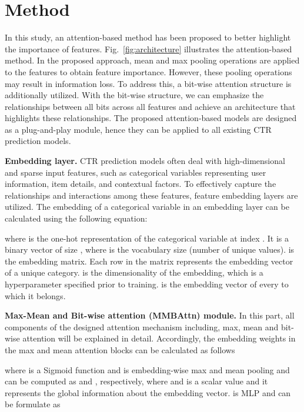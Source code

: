 \documentclass{article}
\begin{document}
\section{Method}
In this study, an attention-based method has been proposed to better highlight the importance of features. Fig.~\ref{fig:architecture} illustrates the attention-based method. In the proposed approach, mean and max pooling operations are applied to the features to obtain feature importance. However, these pooling operations may result in information loss. To address this, a bit-wise attention structure is additionally utilized. With the bit-wise structure, we can emphasize the relationships between all bits across all features and achieve an architecture that highlights these relationships. The proposed attention-based models are designed as a plug-and-play module, hence they can be applied to all existing CTR prediction models.



\noindent\textbf{Embedding layer.} CTR prediction models often deal with high-dimensional and sparse input features, such as categorical variables representing user information, item details, and contextual factors. To effectively capture the relationships and interactions among these features, feature embedding layers are utilized. The embedding of a categorical variable  in an embedding layer can be calculated using the following equation:



\noindent where  is the one-hot representation of the categorical variable  at index . It is a binary vector of size , where  is the vocabulary size (number of unique values).
 is the embedding matrix. Each row in the matrix represents the embedding vector of a unique category.  is the dimensionality of the embedding, which is a hyperparameter specified prior to training.  is the embedding vector of every  to which it belongs.


\noindent\textbf{Max-Mean and Bit-wise attention (MMBAttn) module.} In this part, all components of the designed attention mechanism including, max, mean and bit-wise attention will be explained in detail.
Accordingly, the embedding weights in the max and mean attention blocks can be calculated as follows




\noindent where  is a Sigmoid function and  is embedding-wise max and mean pooling and can be computed as  and , respectively, where  and  is a scalar value and it represents the global information about the  embedding vector.  is MLP and can be formulate as 
\end{document}
